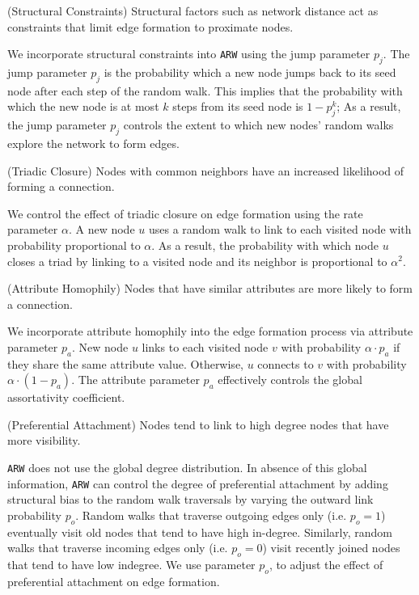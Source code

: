 \begin{ph}
	(Structural Constraints) Structural factors such as network distance
	act as constraints that limit edge formation to proximate nodes.  \cite{35626}
\end{ph}

We incorporate structural constraints into \texttt{ARW} using the jump parameter $p_j$.
The jump parameter $p_j$ is the probability which a new node jumps back to its seed node
after each step of the random walk. This implies that the probability with which the new node
is at most $k$ steps from its seed node is $1-p^k_j$; As a result, the jump parameter $p_j$
controls the extent to which new nodes' random walks explore the network to form edges.

\begin{ph}
	(Triadic Closure) Nodes with common neighbors have an
	increased likelihood of forming a connection. \cite{simmel1950sociology}
\end{ph}

We control the effect of triadic closure on edge formation using the
rate parameter $\alpha$. A new node $u$ uses a random walk to
link to each visited node with probability proportional to $\alpha$. As a
result, the probability with which node $u$ closes a triad by linking to
a visited node and its neighbor is proportional to $\alpha^2$.

\begin{ph}
	(Attribute Homophily) Nodes that have similar attributes are more likely
	to form a connection. \cite{mcpherson2001birds}
\end{ph}
We incorporate attribute homophily into the edge formation process via attribute parameter $p_a$. New node
$u$ links to each visited node $v$ with probability $\alpha \cdot p_a$ if they share
the same attribute value. Otherwise, $u$ connects to $v$ with probability $\alpha \cdot (1-p_a)$.
The attribute parameter $p_a$ effectively controls the global assortativity coefficient.

\begin{ph}
	(Preferential Attachment) Nodes tend to link to high degree nodes that have more
	visibility. \cite{barabasi1999emergence}
\end{ph}
\texttt{ARW} does not use the global degree distribution. In absence of this global information, \texttt{ARW} can control the degree of preferential attachment by adding structural bias to the random walk traversals by varying the outward link probability $p_o$. Random walks that traverse outgoing edges only (i.e. $p_o =1$) eventually visit old nodes that tend to have high in-degree. Similarly, random walks that traverse incoming edges only (i.e. $p_o=0$) visit recently joined nodes that tend to have low indegree. We use parameter $p_o$, to adjust the effect of preferential attachment on edge formation.

